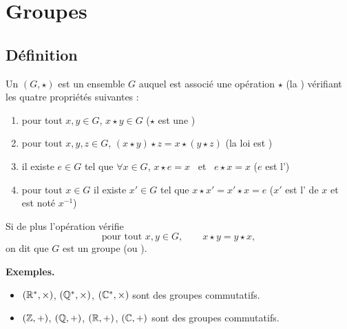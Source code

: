 \documentclass[10pt,class=article,crop=false]{standalone}
\begin{document}
\newcommand{\GL}{\mathcal{G}\!\ell}

\section{Groupes}

\begin{multicols}{2}
	

\subsection{Définition}


Un  $(G,\star)$ est un ensemble $G$ auquel est associé une opération $\star$
(la ) vérifiant les quatre propriétés suivantes :
\begin{enumerate}
	\item \label{it:groupei} pour tout $x,y \in G$, \quad $x \star y \in G$
	\quad  ($\star$ est une )
	
	\item \label{it:groupeii} pour tout $x,y,z \in G$, \quad $(x \star y) \star z = x \star (y \star z)$
	\quad (la loi est )
	
	\item \label{it:groupeiii} il existe $e \in G$ tel que \quad $\forall x \in G$, $x \star e = x$ \  et \  $e \star x = x$
	\quad ($e$ est l')
	
	\item \label{it:groupeiv} pour tout $x \in G$ il existe $x' \in G$ tel que \quad  $x \star x' = x' \star x = e$
	\quad ($x'$ est l' de $x$ et est noté $x^{-1}$)
\end{enumerate}

Si de plus l'opération vérifie
$$ \text{pour tout } x,y \in G,\qquad x \star y = y \star x,$$
on dit que $G$ est un groupe  (ou ).


\textbf{Exemples.}

\begin{itemize}
	\item $(\mathbb{R}^*,\times)$, $(\mathbb{Q}^*,\times)$, $(\mathbb{C}^*, \times)$ sont des groupes commutatifs.
		
	\item $(\mathbb{Z},+)$, $(\mathbb{Q},+)$, $(\mathbb{R},+)$, $(\mathbb{C},+)$ sont des groupes commutatifs.
	

\end{itemize}
\end{multicols}
\end{document}
